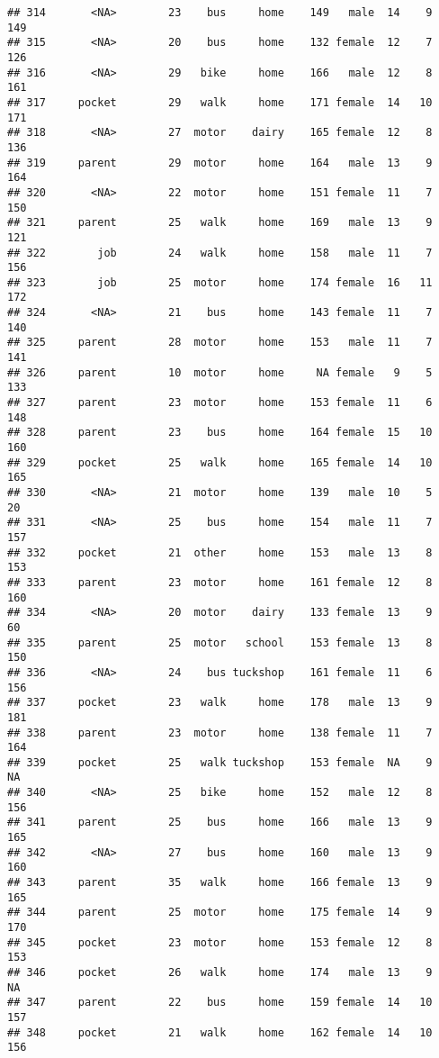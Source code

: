 \documentclass[
]{article}
\begin{document}
\begin{verbatim}
## 314       <NA>        23    bus     home    149   male  14    9     149
## 315       <NA>        20    bus     home    132 female  12    7     126
## 316       <NA>        29   bike     home    166   male  12    8     161
## 317     pocket        29   walk     home    171 female  14   10     171
## 318       <NA>        27  motor    dairy    165 female  12    8     136
## 319     parent        29  motor     home    164   male  13    9     164
## 320       <NA>        22  motor     home    151 female  11    7     150
## 321     parent        25   walk     home    169   male  13    9     121
## 322        job        24   walk     home    158   male  11    7     156
## 323        job        25  motor     home    174 female  16   11     172
## 324       <NA>        21    bus     home    143 female  11    7     140
## 325     parent        28  motor     home    153   male  11    7     141
## 326     parent        10  motor     home     NA female   9    5     133
## 327     parent        23  motor     home    153 female  11    6     148
## 328     parent        23    bus     home    164 female  15   10     160
## 329     pocket        25   walk     home    165 female  14   10     165
## 330       <NA>        21  motor     home    139   male  10    5      20
## 331       <NA>        25    bus     home    154   male  11    7     157
## 332     pocket        21  other     home    153   male  13    8     153
## 333     parent        23  motor     home    161 female  12    8     160
## 334       <NA>        20  motor    dairy    133 female  13    9      60
## 335     parent        25  motor   school    153 female  13    8     150
## 336       <NA>        24    bus tuckshop    161 female  11    6     156
## 337     pocket        23   walk     home    178   male  13    9     181
## 338     parent        23  motor     home    138 female  11    7     164
## 339     pocket        25   walk tuckshop    153 female  NA    9      NA
## 340       <NA>        25   bike     home    152   male  12    8     156
## 341     parent        25    bus     home    166   male  13    9     165
## 342       <NA>        27    bus     home    160   male  13    9     160
## 343     parent        35   walk     home    166 female  13    9     165
## 344     parent        25  motor     home    175 female  14    9     170
## 345     pocket        23  motor     home    153 female  12    8     153
## 346     pocket        26   walk     home    174   male  13    9      NA
## 347     parent        22    bus     home    159 female  14   10     157
## 348     pocket        21   walk     home    162 female  14   10     156

\end{verbatim}
\end{document}
